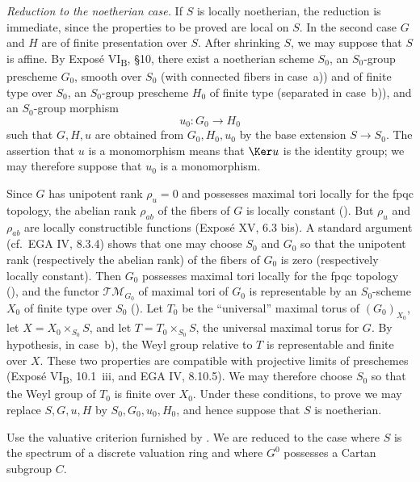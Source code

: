 \smallskip
\noindent\textit{Reduction to the noetherian case.}
If \(S\) is locally noetherian, the reduction is immediate, since the
properties to be proved are local on \(S\). In the second case \(G\)
and \(H\) are of finite presentation over \(S\). After shrinking
\(S\), we may suppose that \(S\) is affine. By Exposé
VI\textsubscript{B}, \S10, there exist a noetherian scheme \(S_0\), an
\(S_0\)-group prescheme \(G_0\), smooth over \(S_0\) (with connected
fibers in case~a)) and of finite type over \(S_0\), an
\(S_0\)-group prescheme \(H_0\) of finite type (separated in case~b)),
and an \(S_0\)-group morphism
\[
  u_0:G_0\longrightarrow H_0
\]
such that \(G,H,u\) are obtained from \(G_0,H_0,u_0\) by the base
extension \(S\to S_0\). The assertion that \(u\) is a monomorphism
means that \(\Ker u\) is the identity group; we may therefore suppose
that \(u_0\) is a monomorphism.

Since \(G\) has unipotent rank \(\rho_u=0\) and possesses maximal
tori locally for the fpqc topology, the abelian rank \(\rho_{ab}\) of
the fibers of \(G\) is locally constant (). But
\(\rho_u\) and \(\rho_{ab}\) are locally constructible functions
(Exposé XV, 6.3 bis). A standard argument (cf.\ EGA IV, 8.3.4) shows
that one may choose \(S_0\) and \(G_0\) so that the unipotent rank
(respectively the abelian rank) of the fibers of \(G_0\) is zero
(respectively locally constant). Then \(G_0\) possesses maximal tori
locally for the fpqc topology (), and the functor
\(\mathcal{TM}_{G_0}\) of maximal tori of \(G_0\) is representable by
an \(S_0\)-scheme \(X_0\) of finite type over \(S_0\) (). Let \(T_0\) be the ``universal'' maximal torus of
\((G_0)_{X_0}\), let \(X=X_0\times_{S_0}S\), and let
\(T=T_0\times_{S_0}S\), the universal maximal torus for \(G\). By
hypothesis, in case~b), the Weyl group relative to \(T\) is
representable and finite over \(X\). These two properties are
compatible with projective limits of preschemes (Exposé
VI\textsubscript{B}, 10.1~iii, and EGA IV, 8.10.5). We may therefore
choose \(S_0\) so that the Weyl group of \(T_0\) is finite over
\(X_0\). Under these conditions, to prove  we may replace
\(S,G,u,H\) by \(S_0,G_0,u_0,H_0\), and hence suppose that \(S\) is
noetherian.

Use the valuative criterion furnished by . We are reduced to the
case where \(S\) is the spectrum of a discrete valuation ring and
where \(G^0\) possesses a Cartan subgroup \(C\).

